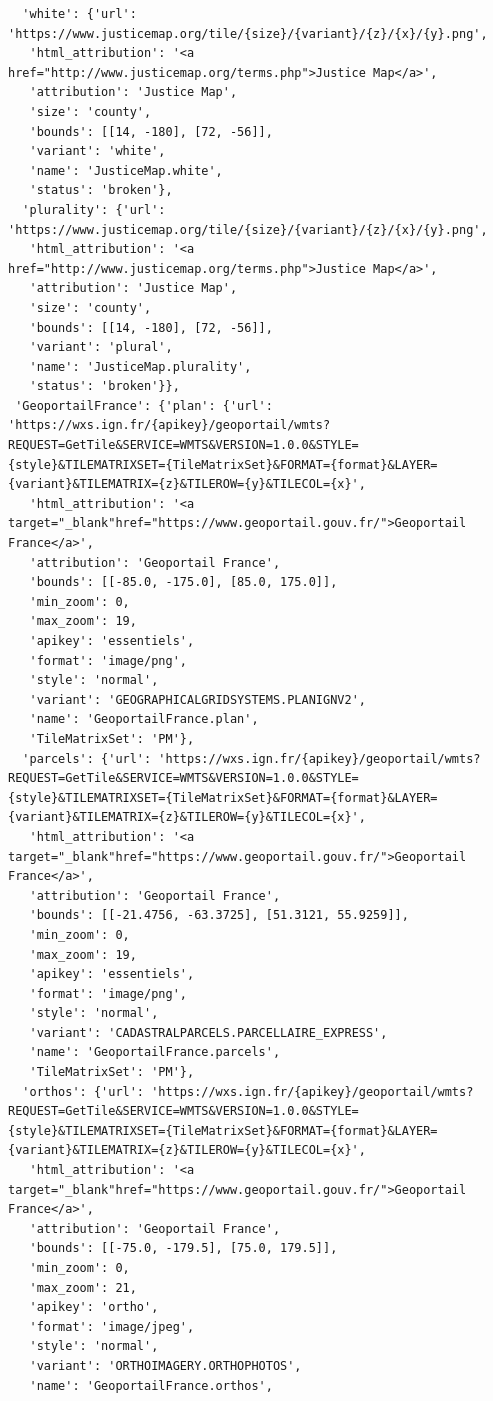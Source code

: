 \documentclass[
  letterpaper,
  DIV=11,
  numbers=noendperiod]{scrreprt}
\begin{document}
\begin{verbatim}
  'white': {'url': 'https://www.justicemap.org/tile/{size}/{variant}/{z}/{x}/{y}.png',
   'html_attribution': '<a href="http://www.justicemap.org/terms.php">Justice Map</a>',
   'attribution': 'Justice Map',
   'size': 'county',
   'bounds': [[14, -180], [72, -56]],
   'variant': 'white',
   'name': 'JusticeMap.white',
   'status': 'broken'},
  'plurality': {'url': 'https://www.justicemap.org/tile/{size}/{variant}/{z}/{x}/{y}.png',
   'html_attribution': '<a href="http://www.justicemap.org/terms.php">Justice Map</a>',
   'attribution': 'Justice Map',
   'size': 'county',
   'bounds': [[14, -180], [72, -56]],
   'variant': 'plural',
   'name': 'JusticeMap.plurality',
   'status': 'broken'}},
 'GeoportailFrance': {'plan': {'url': 'https://wxs.ign.fr/{apikey}/geoportail/wmts?REQUEST=GetTile&SERVICE=WMTS&VERSION=1.0.0&STYLE={style}&TILEMATRIXSET={TileMatrixSet}&FORMAT={format}&LAYER={variant}&TILEMATRIX={z}&TILEROW={y}&TILECOL={x}',
   'html_attribution': '<a target="_blank"href="https://www.geoportail.gouv.fr/">Geoportail France</a>',
   'attribution': 'Geoportail France',
   'bounds': [[-85.0, -175.0], [85.0, 175.0]],
   'min_zoom': 0,
   'max_zoom': 19,
   'apikey': 'essentiels',
   'format': 'image/png',
   'style': 'normal',
   'variant': 'GEOGRAPHICALGRIDSYSTEMS.PLANIGNV2',
   'name': 'GeoportailFrance.plan',
   'TileMatrixSet': 'PM'},
  'parcels': {'url': 'https://wxs.ign.fr/{apikey}/geoportail/wmts?REQUEST=GetTile&SERVICE=WMTS&VERSION=1.0.0&STYLE={style}&TILEMATRIXSET={TileMatrixSet}&FORMAT={format}&LAYER={variant}&TILEMATRIX={z}&TILEROW={y}&TILECOL={x}',
   'html_attribution': '<a target="_blank"href="https://www.geoportail.gouv.fr/">Geoportail France</a>',
   'attribution': 'Geoportail France',
   'bounds': [[-21.4756, -63.3725], [51.3121, 55.9259]],
   'min_zoom': 0,
   'max_zoom': 19,
   'apikey': 'essentiels',
   'format': 'image/png',
   'style': 'normal',
   'variant': 'CADASTRALPARCELS.PARCELLAIRE_EXPRESS',
   'name': 'GeoportailFrance.parcels',
   'TileMatrixSet': 'PM'},
  'orthos': {'url': 'https://wxs.ign.fr/{apikey}/geoportail/wmts?REQUEST=GetTile&SERVICE=WMTS&VERSION=1.0.0&STYLE={style}&TILEMATRIXSET={TileMatrixSet}&FORMAT={format}&LAYER={variant}&TILEMATRIX={z}&TILEROW={y}&TILECOL={x}',
   'html_attribution': '<a target="_blank"href="https://www.geoportail.gouv.fr/">Geoportail France</a>',
   'attribution': 'Geoportail France',
   'bounds': [[-75.0, -179.5], [75.0, 179.5]],
   'min_zoom': 0,
   'max_zoom': 21,
   'apikey': 'ortho',
   'format': 'image/jpeg',
   'style': 'normal',
   'variant': 'ORTHOIMAGERY.ORTHOPHOTOS',
   'name': 'GeoportailFrance.orthos',

\end{verbatim}
\end{document}
